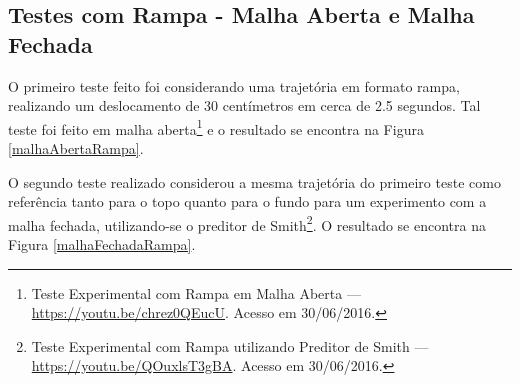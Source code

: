 \subsection{Testes com Rampa - Malha Aberta e Malha Fechada}
O primeiro teste feito foi considerando uma trajetória em formato rampa, realizando um deslocamento de 30 centímetros em cerca de 2.5 segundos. Tal teste foi feito em malha aberta\footnote{Teste Experimental com Rampa em Malha Aberta --- \url{https://youtu.be/chrez0QEucU}. Acesso em 30/06/2016.} e o resultado se encontra na Figura \ref{malhaAbertaRampa}. 

O segundo teste realizado considerou a mesma trajetória do primeiro teste como referência tanto para o topo quanto para o fundo para um experimento com a malha fechada, utilizando-se o preditor de Smith\footnote{Teste Experimental com Rampa utilizando Preditor de Smith --- \url{https://youtu.be/QOuxlsT3gBA}. Acesso em 30/06/2016.}. O resultado se encontra na Figura \ref{malhaFechadaRampa}.

